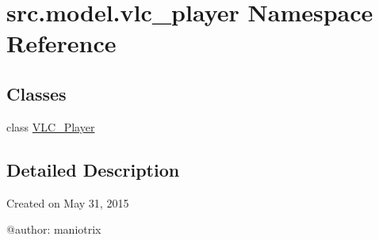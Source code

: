 \hypertarget{namespacesrc_1_1model_1_1vlc__player}{}\section{src.\+model.\+vlc\+\_\+player Namespace Reference}
\label{namespacesrc_1_1model_1_1vlc__player}
\subsection*{Classes}
\begin{DoxyCompactItemize}
\item 
class \hyperlink{classsrc_1_1model_1_1vlc__player_1_1VLC__Player}{V\+L\+C\+\_\+\+Player}
\end{DoxyCompactItemize}


\subsection{Detailed Description}
\begin{DoxyVerb}Created on May 31, 2015

@author: maniotrix
\end{DoxyVerb}
 